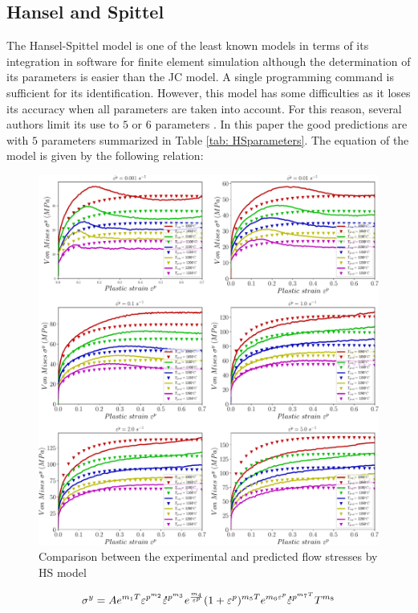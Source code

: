 \documentclass[twoside,english,1p,final,sort&compress]{elsarticle}
\theoremstyle{plain}
\newcommand{\mdot}[1]{\accentset{\mbox{\bfseries .}}{#1}}
\begin{document}
\subsection{Hansel and Spittel\label{sec:HSmodel}}
The Hansel-Spittel model is one of the least known models in terms of its  integration in software for finite element simulation although the determination of its parameters is easier than the JC model. A single programming command is sufficient for its identification. However, this model has some difficulties as it loses its accuracy when all parameters are taken into account. For this reason, several authors limit its use to $5$ or $6$ parameters \cite{Chadha-2018, Rudnytskyj-2020, Mehtedi-2015}. In this paper the good predictions are with $5$ parameters summarized in Table \ref{tab: HSparameters}. The equation of the model is given by the following relation:
\begin{figure}[!ht]
\centering
\includegraphics[width=1.02\columnwidth]
{Figures/CompExpHS}
\caption{Comparison between the experimental and predicted flow stresses by HS model}
\label{fig:iCorrelationHS}
\end{figure}
\begin{equation}
\sigma^y = Ae^{m_1T}\varepsilon^{p^{m_2}}\mdot{\varepsilon}^{p^{m_3}}e^{\frac{m_4}{\varepsilon^p}}(1+\varepsilon^p)^{m_5T}e^{m_6\varepsilon^p}\mdot{\varepsilon}^{p^{m_7T}}T^{m_8}
\end{equation}
\end{document}
